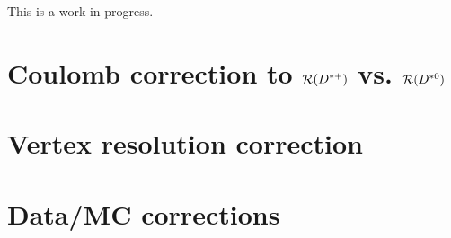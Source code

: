 This is a work in progress.


\section{Coulomb correction to $\mathcal{R}({{D}^{*+}})$ vs. $\mathcal{R}({{D}^{*0}})$}
\label{sys-theory-coulomb}


\section{Vertex resolution correction}
\label{sys-cor-vtx}


\section{Data/MC corrections}
\label{sys-cor-rwt}
